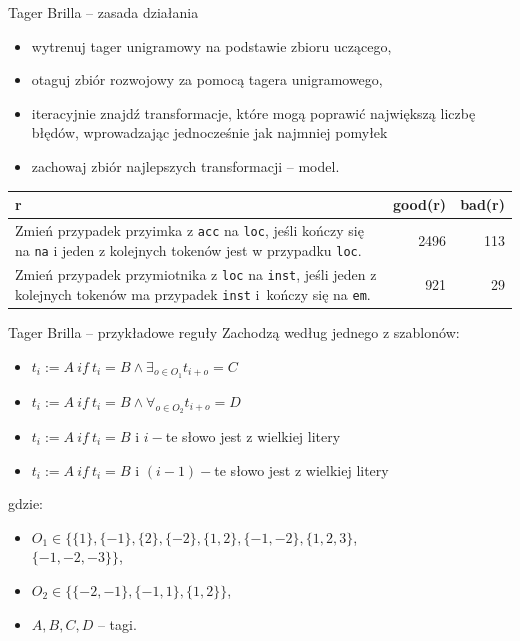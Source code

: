 \documentclass[xcolor=dvipsnames,polish]{beamer}
\begin{document}
\begin{frame}{Tager Brilla -- zasada działania}
\begin{itemize}
  \item wytrenuj tager unigramowy na podstawie zbioru uczącego,
  \item otaguj zbiór rozwojowy za pomocą tagera unigramowego,
  \item iteracyjnie znajdź transformacje, które mogą poprawić największą liczbę błędów, wprowadzając jednocześnie jak najmniej pomyłek
  \item zachowaj zbiór najlepszych transformacji -- model.
\end{itemize}
\begin{tabular}{p{8cm}|r|r}
r & good(r) & bad(r) \\ \hline
Zmień przypadek przyimka z \texttt{acc} na \texttt{loc}, jeśli kończy
się na \texttt{na} i jeden z kolejnych tokenów jest w przypadku
\texttt{loc}. & 2496 & 113 \\ \hline
Zmień przypadek przymiotnika z \texttt{loc} na \texttt{inst}, jeśli jeden z kolejnych tokenów ma przypadek \texttt{inst} i~kończy się na \texttt{em}. & 921 & 29 \\ \hline
\end{tabular}
\end{frame}

\begin{frame}{Tager Brilla -- przykładowe reguły}
Zachodzą według jednego z szablonów:
\begin{itemize}
  \item $t_i := A\ if\ t_i = B \land \exists_{o \in O_1} t_{i+o} = C$
  \item $t_i := A\ if\ t_i = B \land \forall_{o \in O_2} t_{i+o} = D$
  \item $t_i := A\ if\ t_i = B$ i $i-$te słowo jest z wielkiej litery
  \item $t_i := A\ if\ t_i = B$ i $(i-1)-$te słowo jest z wielkiej litery
\end{itemize}
gdzie:
\begin{itemize}
  \item $O_1 \in \{\{1\}, \{-1\}, \{2\}, \{-2\}, \{1, 2\}, \{-1, -2\}, \{1, 2, 3\}$,\\
  $\{-1, -2, -3\}\}$,
  \item $O_2 \in \{\{-2, -1\}, \{-1, 1\}, \{1, 2\}\}$,
  \item $A, B, C, D$ -- tagi.
\end{itemize}
\end{frame}
\end{document}
